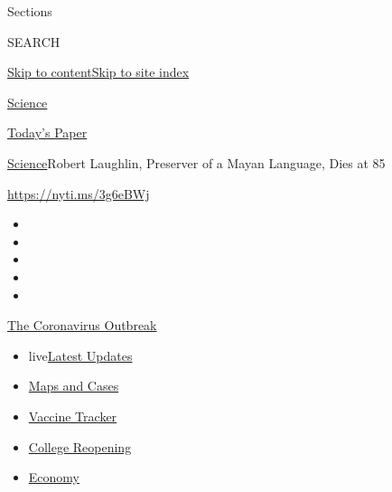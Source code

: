 Sections

SEARCH

\protect\hyperlink{site-content}{Skip to
content}\protect\hyperlink{site-index}{Skip to site index}

\href{https://www.nytimes.com/section/science}{Science}

\href{https://myaccount.nytimes.com/auth/login?response_type=cookie\&client_id=vi}{}

\href{https://www.nytimes.com/section/todayspaper}{Today's Paper}

\href{/section/science}{Science}\textbar{}Robert Laughlin, Preserver of
a Mayan Language, Dies at 85

\url{https://nyti.ms/3g6eBWj}

\begin{itemize}
\item
\item
\item
\item
\item
\end{itemize}

\href{https://www.nytimes.com/news-event/coronavirus?action=click\&pgtype=Article\&state=default\&region=TOP_BANNER\&context=storylines_menu}{The
Coronavirus Outbreak}

\begin{itemize}
\tightlist
\item
  live\href{https://www.nytimes.com/2020/08/03/world/coronavirus-covid-19.html?action=click\&pgtype=Article\&state=default\&region=TOP_BANNER\&context=storylines_menu}{Latest
  Updates}
\item
  \href{https://www.nytimes.com/interactive/2020/us/coronavirus-us-cases.html?action=click\&pgtype=Article\&state=default\&region=TOP_BANNER\&context=storylines_menu}{Maps
  and Cases}
\item
  \href{https://www.nytimes.com/interactive/2020/science/coronavirus-vaccine-tracker.html?action=click\&pgtype=Article\&state=default\&region=TOP_BANNER\&context=storylines_menu}{Vaccine
  Tracker}
\item
  \href{https://www.nytimes.com/2020/08/02/us/covid-college-reopening.html?action=click\&pgtype=Article\&state=default\&region=TOP_BANNER\&context=storylines_menu}{College
  Reopening}
\item
  \href{https://www.nytimes.com/live/2020/08/03/business/stock-market-today-coronavirus?action=click\&pgtype=Article\&state=default\&region=TOP_BANNER\&context=storylines_menu}{Economy}
\end{itemize}

